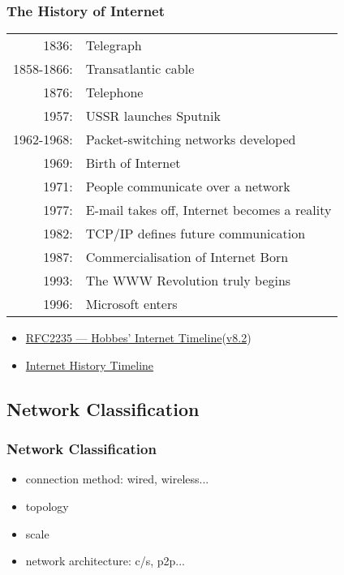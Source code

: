\documentclass[hyperref={xetex,colorlinks,linkcolor=blue},green,compress]{beamer}
\begin{document}
\begin{frame}\frametitle{The History of Internet}

\begin{tabular}{rl}
  1836:&Telegraph\\
  1858-1866:&Transatlantic cable\\
  1876:&Telephone\\
  1957:&USSR launches Sputnik\\
  1962-1968:&Packet-switching networks developed\\
  1969:&Birth of Internet\\
  1971:&People communicate over a network\\
  1977:&E-mail takes off, Internet becomes a reality\\
  1982:&TCP/IP defines future communication\\
  1987:&Commercialisation of Internet Born\\
  1993:&The WWW Revolution truly begins\\
  1996:&Microsoft enters
\end{tabular}
\begin{itemize}
\item \href{http://www.faqs.org/rfcs/rfc2235.html}{RFC2235 --- Hobbes' Internet Timeline}(\href{http://www.zakon.org/robert/internet/timeline/}{v8.2})
\item \href{http://www.netvalley.com/archives/mirrors/davemarsh-timeline-1.htm}{Internet History Timeline}
\end{itemize}
\end{frame}

\subsection[Classification]{Network Classification}
\label{sec:classification}

\begin{frame}\frametitle{Network Classification}

\begin{itemize}
\item connection method: wired, wireless...
\item topology
\item scale
\item network architecture: c/s, p2p...
\end{itemize}

\end{frame}
\end{document}

